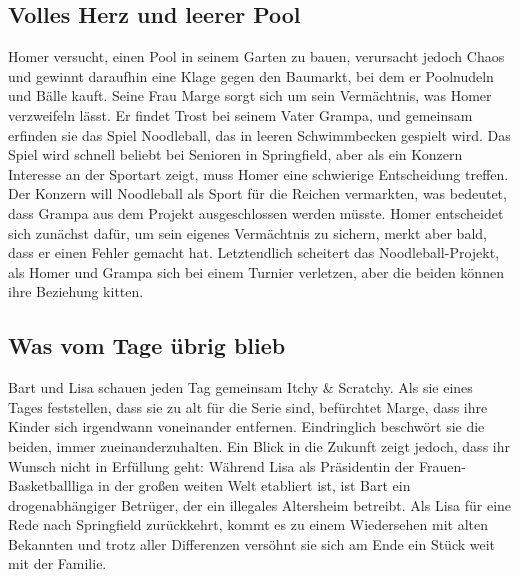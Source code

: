 \subsection{Volles Herz und leerer Pool}
Homer versucht, einen Pool in seinem Garten zu bauen, verursacht jedoch Chaos und gewinnt daraufhin eine Klage gegen den Baumarkt, bei dem er Poolnudeln und Bälle kauft. Seine Frau Marge sorgt sich um sein Vermächtnis, was Homer verzweifeln lässt. Er findet Trost bei seinem Vater Grampa, und gemeinsam erfinden sie das Spiel \glqq Noodleball\grqq, das in leeren Schwimmbecken gespielt wird.
Das Spiel wird schnell beliebt bei Senioren in Springfield, aber als ein Konzern Interesse an der Sportart zeigt, muss Homer eine schwierige Entscheidung treffen. Der Konzern will Noodleball als Sport für die Reichen vermarkten, was bedeutet, dass Grampa aus dem Projekt ausgeschlossen werden müsste. Homer entscheidet sich zunächst dafür, um sein eigenes Vermächtnis zu sichern, merkt aber bald, dass er einen Fehler gemacht hat. Letztendlich scheitert das Noodleball-Projekt, als Homer und Grampa sich bei einem Turnier verletzen, aber die beiden können ihre Beziehung kitten. 

\subsection{Was vom Tage übrig blieb}
Bart und Lisa schauen jeden Tag gemeinsam \glqq Itchy \& Scratchy\grqq. Als sie eines Tages feststellen, dass sie zu alt für die Serie sind, befürchtet Marge, dass ihre Kinder sich irgendwann voneinander entfernen. Eindringlich beschwört sie die beiden, immer zueinanderzuhalten. Ein Blick in die Zukunft zeigt jedoch, dass ihr Wunsch nicht in Erfüllung geht: Während Lisa als Präsidentin der Frauen-Basketballliga in der großen weiten Welt etabliert ist, ist Bart ein drogenabhängiger Betrüger, der ein illegales Altersheim betreibt. Als Lisa für eine Rede nach Springfield zurückkehrt, kommt es zu einem Wiedersehen mit alten Bekannten und trotz aller Differenzen versöhnt sie sich am Ende ein Stück weit mit der Familie.

